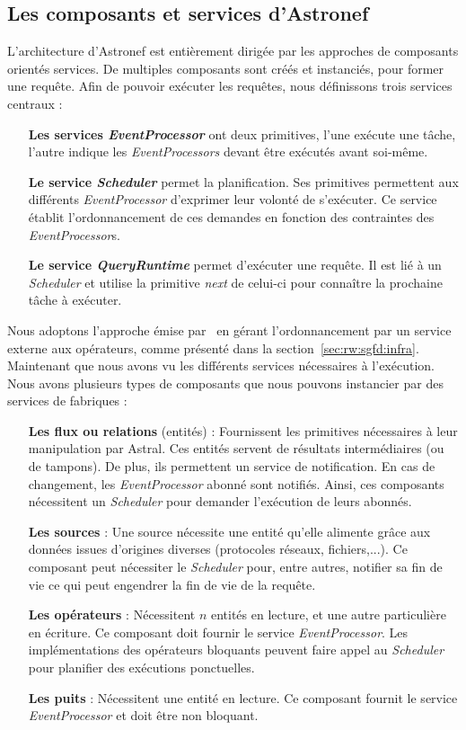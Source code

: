 \subsection{Les composants et services d'Astronef}
L'architecture d'Astronef est entièrement dirigée par les approches de composants orientés services. De multiples composants sont créés et instanciés, pour former une requête. Afin de pouvoir exécuter les requêtes, nous définissons trois services centraux :
\begin{itemize}
	\item[\textbf{Les services \textit{EventProcessor}}] ont deux primitives, l'une exécute une tâche, l'autre indique les \textit{EventProcessors} devant être exécutés avant soi-même.
	\item[\textbf{Le service \textit{Scheduler}}] permet la planification. Ses primitives permettent aux différents \textit{EventProcessor} d'exprimer leur volonté de s'exécuter. Ce service établit l'ordonnancement de ces demandes en fonction des contraintes des \textit{EventProcessor}s.
	\item[\textbf{Le service \textit{QueryRuntime}}] permet d'exécuter une requête. Il est lié à un \textit{Scheduler} et utilise la primitive \textit{next} de celui-ci pour connaître la prochaine tâche à exécuter.
\end{itemize}

Nous adoptons l'approche émise par~\cite{Carney:scheduling} en gérant l'ordonnancement par un service externe aux opérateurs, comme présenté dans la section~\ref{sec:rw:sgfd:infra}. Maintenant que nous avons vu les différents services nécessaires à l'exécution. Nous avons plusieurs types de composants que nous pouvons instancier par des services de fabriques :
\begin{itemize}
	\item[\textbf{Les flux ou relations} (entités)] : Fournissent les primitives nécessaires à leur manipulation par Astral. Ces entités servent de résultats intermédiaires (ou de tampons). De plus, ils permettent un service de notification. En cas de changement, les \textit{EventProcessor} abonné sont notifiés. Ainsi, ces composants nécessitent un \textit{Scheduler} pour demander l'exécution de leurs abonnés.
	\item[\textbf{Les sources}] : Une source nécessite une entité qu'elle alimente grâce aux données issues d'origines diverses (protocoles réseaux, fichiers,...). Ce composant peut nécessiter le \textit{Scheduler} pour, entre autres, notifier sa fin de vie ce qui peut engendrer la fin de vie de la requête.
	\item[\textbf{Les opérateurs}] : Nécessitent $n$ entités en lecture, et une autre particulière en écriture. Ce composant doit fournir le service \textit{EventProcessor}. Les implémentations des opérateurs bloquants peuvent faire appel au \textit{Scheduler} pour planifier des exécutions ponctuelles.
	\item[\textbf{Les puits}] : Nécessitent une entité en lecture. Ce composant fournit le service \textit{EventProcessor} et doit être non bloquant.
\end{itemize}

